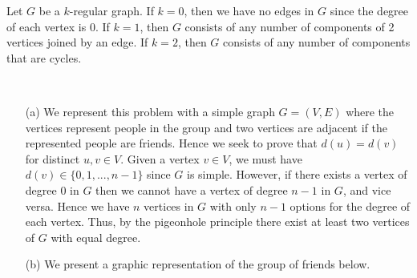 \begin{ans}
Let $G$ be a $k$-regular graph. If $k=0$, then we have no edges in $G$ since the degree of each vertex is 0. If $k=1$, then $G$ consists of any number of components of 2 vertices joined by an edge. If $k=2$, then $G$ consists of any number of components that are cycles.
\end{ans}

\begin{ans} \
\begin{itemize}
	\item[(a)] We represent this problem with a simple graph $G = (V,E)$ where the vertices represent people in the group and two vertices are adjacent if the represented people are friends. Hence we seek to prove that $d(u) = d(v)$ for distinct $u,v \in V$. Given a vertex $v \in V$, we must have $d(v) \in \{0,1,...,n-1\}$ since $G$ is simple. However, if there exists a vertex of degree 0 in $G$ then we cannot have a vertex of degree $n-1$ in $G$, and vice versa. Hence we have $n$ vertices in $G$ with only $n-1$ options for the degree of each vertex. Thus, by the pigeonhole principle there exist at least two vertices of $G$ with equal degree.
	\item[(b)] We present a graphic representation of the group of friends below.
	\begin{center}
	\end{center}
\end{itemize}
\end{ans}

\newpage

